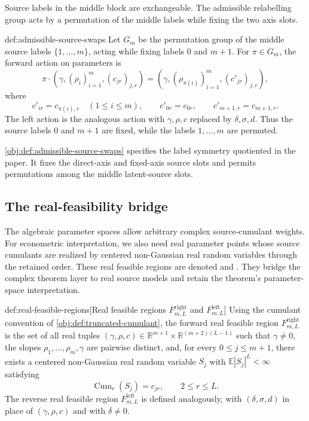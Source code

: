 \documentclass[11pt]{article}
\begin{document}
Source labels in the middle block are exchangeable. The admissible relabelling group  acts by a permutation  of the middle labels while fixing the two axis slots.

\begin{definitionv}{def:admissible-source-swaps}
Let \(G_m\) be the permutation group of the middle source labels \(\{1,\ldots,m\}\), acting while fixing labels \(0\) and \(m+1\). For \(\pi\in G_m\), the forward action on parameters is
\[
\pi\cdot(\gamma,(\rho_i)_{i=1}^m,(c_{jr})_{j,r})
=
(\gamma,(\rho_{\pi(i)})_{i=1}^m,(c'_{jr})_{j,r}),
\]
where
\[
c'_{ir}=c_{\pi(i),r}\quad(1\le i\le m),\qquad
c'_{0r}=c_{0r},\qquad
c'_{m+1,r}=c_{m+1,r}.
\]
The left action is the analogous action with \(\gamma,\rho,c\) replaced by \(\delta,\sigma,d\). Thus the source labels \(0\) and \(m+1\) are fixed, while the labels \(1,\ldots,m\) are permuted.
\end{definitionv}

\cref{obj:def:admissible-source-swaps} specifies the label symmetry quotiented in the paper. It fixes the direct-axis and fixed-axis source slots and permits permutations among the middle latent-source slots.

\subsection{The real-feasibility bridge}

The algebraic parameter spaces allow arbitrary complex source-cumulant weights. For econometric interpretation, we also need real parameter points whose source cumulants are realized by centered non-Gaussian real random variables through the retained order. These real feasible regions are denoted  and . They bridge the complex theorem layer to real source models and retain the theorem's parameter-space interpretation.

\begin{definitionv}{def:real-feasible-regions}[Real feasible regions \(F^{\mathrm{right}}_{m,L}\) and \(F^{\mathrm{left}}_{m,L}\)]
Using the cumulant convention of \cref{obj:def:truncated-cumulant}, the forward real feasible region \(F^{\mathrm{right}}_{m,L}\) is the set of all real tuples \((\gamma,\rho,c)\in \mathbb R^{m+1}\times \mathbb R^{(m+2)(L-1)}\) such that \(\gamma\neq 0\), the slopes \(\rho_1,\ldots,\rho_m,\gamma\) are pairwise distinct, and, for every \(0\leq j\leq m+1\), there exists a centered non-Gaussian real random variable \(S_j\) with \(\mathbb E|S_j|^L<\infty\) satisfying
\[
\operatorname{Cum}_r(S_j)=c_{jr},
\qquad 2\leq r\leq L.
\]
The reverse real feasible region \(F^{\mathrm{left}}_{m,L}\) is defined analogously, with \((\delta,\sigma,d)\) in place of \((\gamma,\rho,c)\) and with \(\delta\neq 0\).
\end{definitionv}
\end{document}
